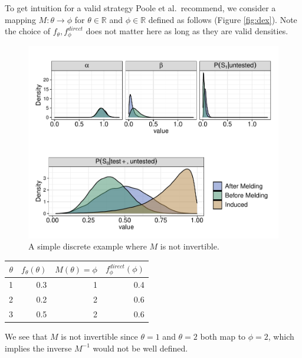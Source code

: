 \documentclass[12pt,twoside]{smiththesis}
\begin{document}
To get intuition for a valid strategy Poole et al.~recommend, we consider a mapping \(M: \theta \to \phi\) for \(\theta \in \mathbb{R}\) and \(\phi \in \mathbb{R}\)
defined as follows (Figure \ref{fig:dex}). Note the choice of \(f_\theta,f_\phi^{direct}\) does not matter here as long as they are valid densities.
\begin{multicols}{2}
\begin{figure}

{\centering \includegraphics[width=1\linewidth]{thesis_files/figure-latex/unnamed-chunk-12-1} 

}

\caption{\label{fig:dex}A simple discrete example where $M$ is not invertible.}\label{fig:unnamed-chunk-12}
\end{figure}
\columnbreak
\begin{table}[H]
\centering
\begin{tabular}[t]{r|r|r|r}
\hline
$\theta$ & $f_\theta(\theta)$ & $M(\theta)=\phi$ & $f_\phi^{direct}(\phi)$\\
\hline
1 & 0.3 & 1 & 0.4\\
\hline
2 & 0.2 & 2 & 0.6\\
\hline
3 & 0.5 & 2 & 0.6\\
\hline
\end{tabular}
\end{table}
\end{multicols}
We see that \(M\) is not invertible since \(\theta=1\) and \(\theta = 2\) both map to \(\phi=2\), which implies the inverse \(M^{-1}\) would not be well defined.
\end{document}
